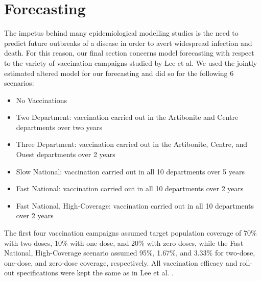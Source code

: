 \documentclass[12pt]{article}
\begin{document}
\section{Forecasting}

 The impetus behind many epidemiological modelling studies is the need to predict future outbreaks of a disease in order to avert widespread infection and death. For this reason, our final section concerns model forecasting with respect to the variety of vaccination campaigns studied by Lee et al. We used the jointly estimated altered model for our forecasting and did so for the following 6 scenarios:
        \begin{itemize}
        \item No Vaccinations
        \item Two Department: vaccination carried out in the Artibonite and Centre departments over two years
        \item Three Department: vaccination carried out in the Artibonite, Centre, and Ouest departments over 2 years
        \item Slow National: vaccination carried out in all 10 departments over 5 years
        \item Fast National: vaccination carried out in all 10 departments over 2 years
        \item Fast National, High-Coverage: vaccination carried out in all 10 departments over 2 years
        \end{itemize}
        
\noindent The first four vaccination campaigns assumed target population coverage of 70\% with two doses, 10\% with one dose, and 20\% with zero doses, while the Fast National, High-Coverage scenario assumed 95\%, 1.67\%, and 3.33\% for two-dose, one-dose, and zero-dose coverage, respectively. All vaccination efficacy and roll-out specifications were kept the same as in Lee et al. \cite{Lee_supp}.
\end{document}
